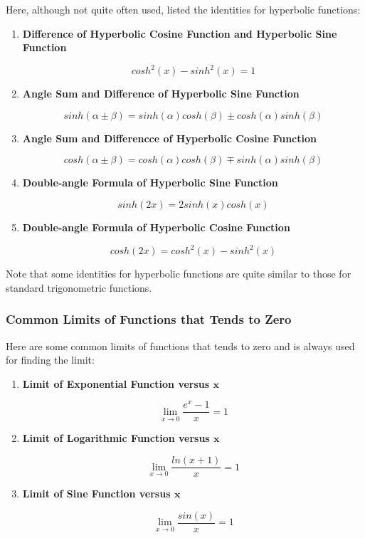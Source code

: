 \documentclass[a4paper,12pt]{article}
\newenvironment{alist}{ %
\begin{enumerate}[label=(\alph*)]
}{
\end{enumerate}
}
\begin{document}
Here, although not quite often used, listed the identities for hyperbolic functions:

\begin{alist}
  \item \textbf{Difference of Hyperbolic Cosine Function and Hyperbolic Sine Function}

  $$cosh^{2}(x)-sinh^{2}(x)=1$$

  \item \textbf{Angle Sum and Difference of Hyperbolic Sine Function}

  $$sinh(\alpha\pm \beta)=sinh(\alpha)cosh(\beta)\pm cosh(\alpha)sinh(\beta)$$

  \item \textbf{Angle Sum and Differencce of Hyperbolic Cosine Function}

  $$cosh(\alpha\pm \beta)=cosh(\alpha)cosh(\beta)\mp sinh(\alpha)sinh(\beta)$$

  \item \textbf{Double-angle Formula of Hyperbolic Sine Function}

  $$sinh(2x)=2sinh(x)cosh(x)$$

  \item \textbf{Double-angle Formula of Hyperbolic Cosine Function}

  $$cosh(2x)=cosh^{2}(x)-sinh^{2}(x)$$

\end{alist}

Note that some identities for hyperbolic functions are quite similar to those for standard trigonometric functions.

\subsubsection{Common Limits of Functions that Tends to Zero}
Here are some common limits of functions that tends to zero and is always used for finding the limit:

\begin{alist}
  \item \textbf{Limit of Exponential Function versus $\boldsymbol{x}$}

  $$\lim_{x\to 0}\frac{e^{x}-1}{x}=1$$

  \item \textbf{Limit of Logarithmic Function versus $\boldsymbol{x}$}

  $$\lim_{x\to 0}\frac{ln(x+1)}{x}=1$$

  \item \textbf{Limit of Sine Function versus $\boldsymbol{x}$}

  $$\lim_{x\to 0}\frac{sin(x)}{x}=1$$

\end{alist}
\end{document}

